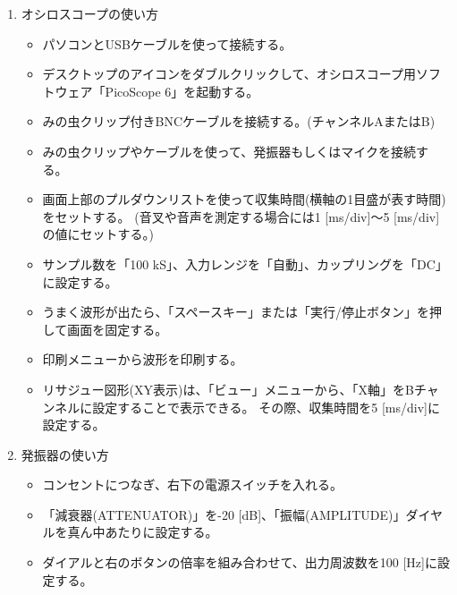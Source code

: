 \begin{enumerate}

\item オシロスコープの使い方

\begin{itemize}

\item パソコンとUSBケーブルを使って接続する。

\item デスクトップのアイコンをダブルクリックして、オシロスコープ用ソフトウェア「PicoScope 6」を起動する。

\item みの虫クリップ付きBNCケーブルを接続する。(チャンネルAまたはB)

\item みの虫クリップやケーブルを使って、発振器もしくはマイクを接続する。

\item 画面上部のプルダウンリストを使って収集時間(横軸の1目盛が表す時間)をセットする。
(音叉や音声を測定する場合には1 [ms/div]〜5 [ms/div]の値にセットする。)


\item サンプル数を「100 kS」、入力レンジを「自動」、カップリングを「DC」に設定する。

\item うまく波形が出たら、「スペースキー」または「実行/停止ボタン」を押して画面を固定する。

\item 印刷メニューから波形を印刷する。

\item リサジュー図形(XY表示)は、「ビュー」メニューから、「X軸」をBチャンネルに設定することで表示できる。
その際、収集時間を5 [ms/div]に設定する。

\end{itemize}

\item 発振器の使い方

\begin{itemize}

\item コンセントにつなぎ、右下の電源スイッチを入れる。

\item 「減衰器(ATTENUATOR)」を-20 [dB]、「振幅(AMPLITUDE)」ダイヤルを真ん中あたりに設定する。

\item ダイアルと右のボタンの倍率を組み合わせて、出力周波数を100 [Hz]に設定する。


\end{itemize}


\end{enumerate}


